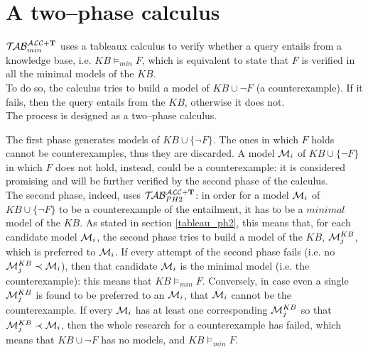 \documentclass[a4paper, 11pt, oneside]{duthesis}
\newcommand{\tip}{{\bf T}}
\newcommand{\unione} {\cup}
\newcommand{\nott} {\lnot}
\newcommand{\emme} {\begin{mathcal}M\end{mathcal}}
\newcommand{\nuovoc}{\mathrel{{\mathcal{T}\!\mathcal{AB}}}_{min}^{\mathcal{ALC}+\mbox{\scriptsize $\tip$}}}
\newcommand{\secondo}{\mathrel{{\mathcal{T}\!\mathcal{AB}}}_{PH 2}^{\mathcal{ALC}+\mbox{\scriptsize $\tip$}}}
\begin{document}
\newpage

\section{A two--phase calculus}\label{calc_2ph}

$\nuovoc$ uses a tableaux calculus to verify whether a query entails from a knowledge base, i.e. $KB \models_{min} F$, which is equivalent to state that $F$ is verified in all the minimal models of the $KB$.\\
To do so, the calculus tries to build a model of $KB \unione \neg F$ (a counterexample). If it fails, then the query entails from the $KB$, otherwise it does not.\\

The process is designed as a two--phase calculus.

The first phase generates models of $KB \unione \{\nott F\}$. The ones in which $F$ holds cannot be counterexamples, thus they are discarded. A model $\emme_i$ of $KB \unione \{\nott F\}$ in which $F$ does not hold, instead, could be a counterexample: it is considered promising and will be further verified by the second phase of the calculus.\\
The second phase, indeed, uses $\secondo$: in order for a model $\emme_i$ of $KB \unione \{\nott F\}$ to be a counterexample of the entailment, it has to be a $minimal$ model of the $KB$. As stated in section \ref{tableau_ph2}, this means that, for each candidate model $\emme_i$, the second phase tries to build a model of the $KB$, $\emme_j^{KB}$, which is preferred to $\emme_i$. If every attempt of the second phase fails (i.e. no $\emme_j^{KB} \prec \emme_i$), then that candidate $\emme_i$ is the minimal model (i.e. the counterexample): this means that $KB \models_{min} F$.
Conversely, in case even a single $\emme_j^{KB}$ is found to be preferred to an $\emme_i$, that $\emme_i$ cannot be the counterexample.
If every $\emme_i$ has at least one corresponding $\emme_j^{KB}$ so that $\emme_j^{KB} \prec \emme_i$, then the whole research for a counterexample has failed, which means that $KB \unione \neg F$ has no models, and $KB \models_{min} F$.\\

\end{document}
